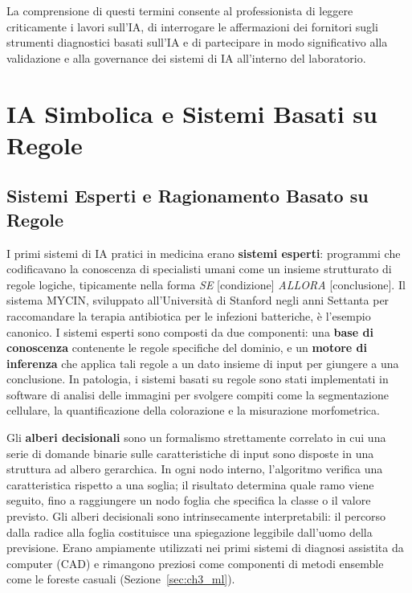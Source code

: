 La comprensione di questi termini consente al professionista di leggere criticamente i lavori sull'IA, di interrogare le affermazioni dei fornitori sugli strumenti diagnostici basati sull'IA e di partecipare in modo significativo alla validazione e alla governance dei sistemi di IA all'interno del laboratorio.

\section{IA Simbolica e Sistemi Basati su Regole}
\label{sec:ch3_symbolic}

\subsection{Sistemi Esperti e Ragionamento Basato su Regole}

I primi sistemi di IA pratici in medicina erano \textbf{sistemi esperti}: programmi che codificavano la conoscenza di specialisti umani come un insieme strutturato di regole logiche, tipicamente nella forma \textit{SE} [condizione] \textit{ALLORA} [conclusione]. Il sistema MYCIN, sviluppato all'Università di Stanford negli anni Settanta per raccomandare la terapia antibiotica per le infezioni batteriche, è l'esempio canonico. I sistemi esperti sono composti da due componenti: una \textbf{base di conoscenza} contenente le regole specifiche del dominio, e un \textbf{motore di inferenza} che applica tali regole a un dato insieme di input per giungere a una conclusione. In patologia, i sistemi basati su regole sono stati implementati in software di analisi delle immagini per svolgere compiti come la segmentazione cellulare, la quantificazione della colorazione e la misurazione morfometrica.

Gli \textbf{alberi decisionali} sono un formalismo strettamente correlato in cui una serie di domande binarie sulle caratteristiche di input sono disposte in una struttura ad albero gerarchica. In ogni nodo interno, l'algoritmo verifica una caratteristica rispetto a una soglia; il risultato determina quale ramo viene seguito, fino a raggiungere un nodo foglia che specifica la classe o il valore previsto. Gli alberi decisionali sono intrinsecamente interpretabili: il percorso dalla radice alla foglia costituisce una spiegazione leggibile dall'uomo della previsione. Erano ampiamente utilizzati nei primi sistemi di diagnosi assistita da computer (CAD) e rimangono preziosi come componenti di metodi ensemble come le foreste casuali (Sezione~\ref{sec:ch3_ml}).

